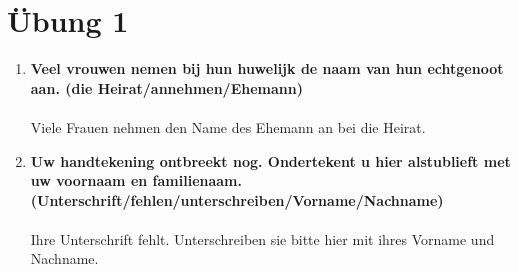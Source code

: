 \documentclass[main.tex]{subfiles}
\begin{document}
\section{Übung 1}
\begin{enumerate}
\item \textbf{Veel vrouwen nemen bij hun huwelijk de naam van hun echtgenoot aan. (die Heirat/annehmen/Ehemann)}\\ \\
Viele Frauen nehmen den Name des Ehemann an bei die Heirat.
\item \textbf{Uw handtekening ontbreekt nog. Ondertekent u hier alstublieft met uw voornaam en familienaam. (Unterschrift/fehlen/unterschreiben/Vorname/Nachname)}\\ \\
Ihre Unterschrift fehlt. Unterschreiben sie bitte hier mit ihres Vorname und Nachname.
\end{enumerate}
\end{document}
